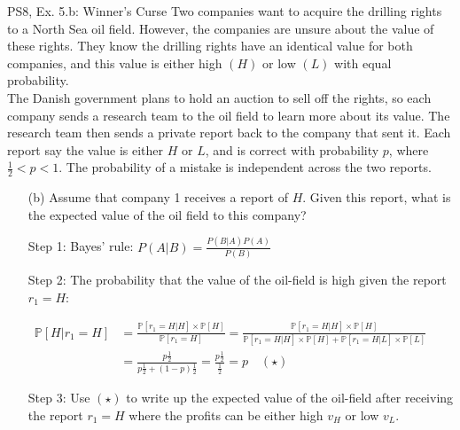 \begin{frame}{PS8, Ex. 5.b: Winner's Curse}
      Two companies want to acquire the drilling rights to a North Sea oil field. However, the companies are unsure about the value of these rights. They know the drilling rights have an identical value for both companies, and this value is either high $(H)$ or low $(L)$ with equal probability.\\\smallskip
      The Danish government plans to hold an auction to sell off the rights, so each company sends a research team to the oil field to learn more about its value. The research team then sends a private report back to the company that sent it. Each report say the value is either $H$ or $L$, and is correct with probability $p$, where $\frac{1}{2} < p < 1$. The probability of a mistake is independent across the two reports.
      \begin{itemize}
        \item[(b)] Assume that company 1 receives a report of $H$. Given this report, what is the expected value of the oil field to this company?
        \item[Step 1:] Bayes' rule: $P(A|B)=\frac{P(B|A)P(A)}{P(B)}$
        \item[Step 2:] The probability that the value of the oil-field is high given the report $r_1=H$:
      \end{itemize}
      \vspace{-8pt}
      \begin{align*}
        \mathbb{P}[H|r_1=H]
        &=\frac{\mathbb{P}[r_1=H|H]\times\mathbb{P}[H]}{\mathbb{P}[r_1=H]}
        =\frac{\mathbb{P}[r_1=H|H]\times\mathbb{P}[H]}{\mathbb{P}[r_1=H|H]\times\mathbb{P}[H]+\mathbb{P}[r_1=H|L]\times\mathbb{P}[L]}\\
        &=\frac{p\frac{1}{2}}{p\frac{1}{2}+(1-p)\frac{1}{2}}=\frac{p\frac{1}{2}}{\frac{1}{2}}=p\quad (\star)
      \end{align*}
      \vspace{-10pt}
      \begin{itemize}
        \item[Step 3:] Use $(\star)$ to write up the expected value of the oil-field after receiving the report $r_1=H$ where the profits can be either high $v_H$ or low $v_L$.
      \end{itemize}
      \vfill\null
\end{frame}
